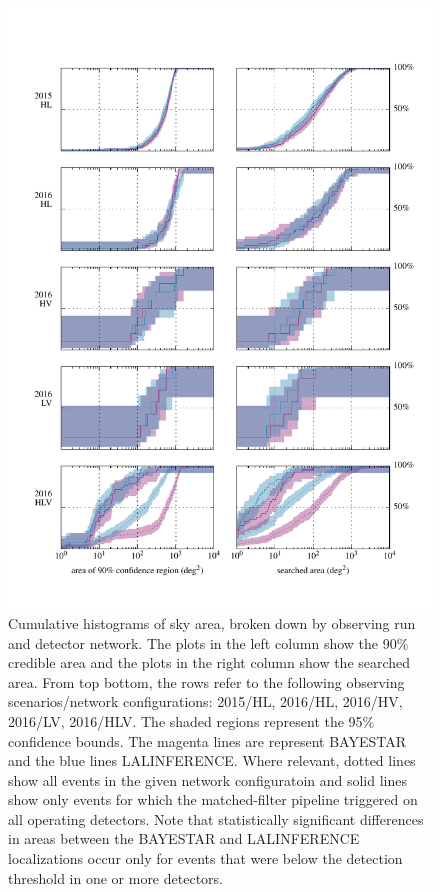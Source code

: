 \documentclass[amsmath,amssymb,aps,prx,reprint,nopreprintnumbers,nofootinbib]{revtex4-1}
\begin{document}
\begin{figure}
    \includegraphics{area-hist}
    \caption{\label{fig:area-hist}Cumulative histograms of sky area, broken down by observing run and detector network. The plots in the left column show the 90\% credible area and the plots in the right column show the searched area. From top bottom, the rows refer to the following observing scenarios/network configurations: 2015/HL, 2016/HL, 2016/HV, 2016/LV, 2016/HLV. The shaded regions represent the 95\% confidence bounds. The magenta lines are represent \ac{BAYESTAR} and the blue lines LALINFERENCE. Where relevant, dotted lines show all events in the given network configuratoin and solid lines show only events for which the matched\nobreakdashes-filter pipeline triggered on all operating detectors. Note that statistically significant differences in areas between the \ac{BAYESTAR} and LALINFERENCE localizations occur only for events that were below the detection threshold in one or more detectors.}
\end{figure}
\end{document}
